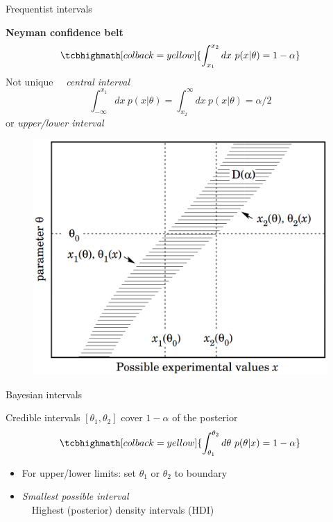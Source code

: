 \documentclass[
aspectratio=169,
14pt,
professionalfonts
]{beamer}
\newcommand{\arrow}{~\ding{220}~}
\begin{document}
\begin{frame}{Frequentist intervals}

\begin{minipage}[t]{0.55\linewidth}
\textbf{Neyman confidence belt}
$$
\tcbhighmath[colback=yellow]{
\int_{x_1}^{x_2} dx ~ p(x|\theta) = 1-\alpha
}
$$
Not unique \arrow \textit{central interval}
\small
$$
\int_{-\infty}^{x_1} dx ~ p(x|\theta)=  \int_{x_2}^{\infty} dx ~ p(x|\theta) = \alpha/2
$$
\normalsize
or \textit{upper/lower interval}
\end{minipage}
\begin{minipage}[t]{0.44\linewidth}
    \begin{figure}
        \centering
        \includegraphics[width=\linewidth]{../plots/neyman.png}
    \end{figure}
\end{minipage}
\end{frame}

\begin{frame}{Bayesian intervals}

Credible intervals $[\theta_1, \theta_2]$ cover $1-\alpha$ of the posterior
$$
\tcbhighmath[colback=yellow]{
\int_{\theta_1}^{\theta_2} d\theta ~ p(\theta| x) = 1-\alpha
}
$$
\begin{itemize}
    \item For upper/lower limits: set $\theta_1$ or $\theta_2$ to boundary
    \item \textit{Smallest possible interval}\\
        \arrow Highest (posterior) density intervals (HDI)
\end{itemize}
\end{frame}
\end{document}
